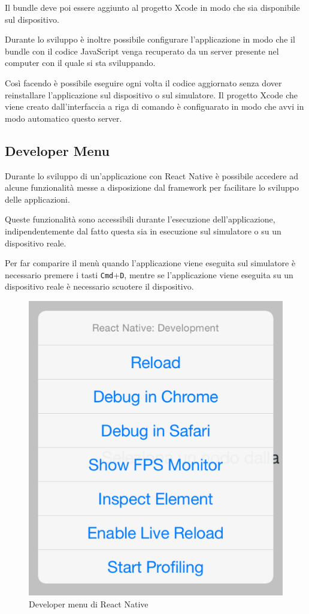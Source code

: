 Il bundle deve poi essere aggiunto al progetto Xcode in modo che sia disponibile sul dispositivo.

Durante lo sviluppo è inoltre possibile configurare l'applicazione in modo che il bundle con il codice JavaScript venga recuperato da un server presente nel computer con il quale si sta sviluppando.

Così facendo è possibile eseguire ogni volta il codice aggiornato senza dover reinstallare l'applicazione sul dispositivo o sul simulatore.
Il progetto Xcode che viene creato dall'interfaccia a riga di comando è configuarato in modo che avvi in modo automatico questo server.

\subsection{Developer Menu}

Durante lo sviluppo di un'applicazione con React Native è possibile accedere ad alcune funzionalità messe a disposizione dal framework per facilitare lo sviluppo delle applicazioni.

Queste funzionalità sono accessibili durante l'esecuzione dell'applicazione, indipendentemente dal fatto questa sia in esecuzione sul simulatore o su un dispositivo reale.

Per far comparire il menù quando l'applicazione viene eseguita sul simulatore è necessario premere i tasti \texttt{Cmd}+\texttt{D}, mentre se l'applicazione viene eseguita su un dispositivo reale è necessario scuotere il dispositivo.

\begin{figure}[htp]
\centering
\includegraphics[width=\textwidth*1/3]{../immagini/rn-devmenu}
\caption{Developer menu di React Native}  
\end{figure}

